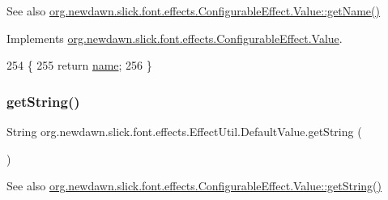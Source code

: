 \begin{DoxySeeAlso}{See also}
\mbox{\hyperlink{interfaceorg_1_1newdawn_1_1slick_1_1font_1_1effects_1_1_configurable_effect_1_1_value_afa269488801c0c0f4edc106453186629}{org.\+newdawn.\+slick.\+font.\+effects.\+Configurable\+Effect.\+Value\+::get\+Name()}} 
\end{DoxySeeAlso}


Implements \mbox{\hyperlink{interfaceorg_1_1newdawn_1_1slick_1_1font_1_1effects_1_1_configurable_effect_1_1_value_afa269488801c0c0f4edc106453186629}{org.\+newdawn.\+slick.\+font.\+effects.\+Configurable\+Effect.\+Value}}.


\begin{DoxyCode}
254                                 \{
255             \textcolor{keywordflow}{return} \mbox{\hyperlink{classorg_1_1newdawn_1_1slick_1_1font_1_1effects_1_1_effect_util_1_1_default_value_ae33082e2b5adea01e0d97dbf24d03170}{name}};
256         \}
\end{DoxyCode}
\mbox{\label{classorg_1_1newdawn_1_1slick_1_1font_1_1effects_1_1_effect_util_1_1_default_value_ac957e1c14528cf85e62df2cbeaadf715}} 
\subsubsection{\texorpdfstring{get\+String()}{getString()}}
{\footnotesize\ttfamily String org.\+newdawn.\+slick.\+font.\+effects.\+Effect\+Util.\+Default\+Value.\+get\+String (\begin{DoxyParamCaption}{ }\end{DoxyParamCaption})\hspace{0.3cm}{\ttfamily [inline]}}

\begin{DoxySeeAlso}{See also}
\mbox{\hyperlink{interfaceorg_1_1newdawn_1_1slick_1_1font_1_1effects_1_1_configurable_effect_1_1_value_a08be303b8f3992da862325722d0b234f}{org.\+newdawn.\+slick.\+font.\+effects.\+Configurable\+Effect.\+Value\+::get\+String()}} 
\end{DoxySeeAlso}


